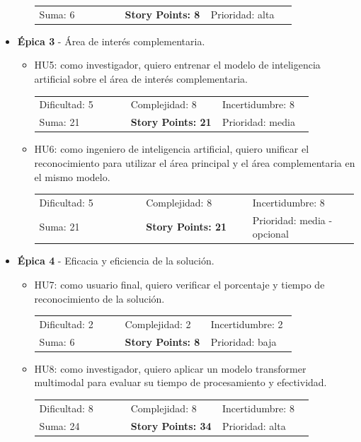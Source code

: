 \documentclass[
11pt, %
]{charter}
\begin{document}
\begin{itemize}
\begin{itemize}
\begin{tabular}{p{0.33\linewidth} p{0.33\linewidth} p{0.33\linewidth}}
      Suma: 6		& \textbf{Story Points: 8} & Prioridad: alta \\
      \end{tabular}
    \end{itemize}
  \item \textbf{\'{E}pica 3} - Área de interés complementaria.
    \begin{itemize}
      \item HU5: como investigador, quiero entrenar el modelo de inteligencia artificial sobre el área de interés complementaria. \\
      \begin{tabular}{p{0.33\linewidth} p{0.33\linewidth} p{0.33\linewidth}}
      Dificultad: 5	& Complejidad: 8 & Incertidumbre: 8 \\
      Suma: 21		& \textbf{Story Points: 21} & Prioridad: media \\
      \end{tabular}
      \item HU6: como ingeniero de inteligencia artificial, quiero unificar el reconocimiento para utilizar el área principal y el área complementaria en el mismo modelo. \\
      \begin{tabular}{p{0.33\linewidth} p{0.33\linewidth} p{0.33\linewidth}}
      Dificultad: 5	& Complejidad: 8 & Incertidumbre: 8 \\
      Suma: 21		& \textbf{Story Points: 21} & Prioridad: media - opcional \\
      \end{tabular}
    \end{itemize}
\newpage
  \item \textbf{\'{E}pica 4} - Eficacia y eficiencia de la solución.
    \begin{itemize}
      \item HU7: como usuario final, quiero verificar el porcentaje y tiempo de reconocimiento de la solución. \\
      \begin{tabular}{p{0.33\linewidth} p{0.33\linewidth} p{0.33\linewidth}}
      Dificultad: 2	& Complejidad: 2 & Incertidumbre: 2 \\
      Suma: 6		& \textbf{Story Points: 8} & Prioridad: baja \\
      \end{tabular}
      \item HU8: como investigador, quiero aplicar un modelo transformer multimodal para evaluar su tiempo de procesamiento y efectividad. \\
      \begin{tabular}{p{0.33\linewidth} p{0.33\linewidth} p{0.33\linewidth}}
      Dificultad: 8	& Complejidad: 8 & Incertidumbre: 8 \\
      Suma: 24		& \textbf{Story Points: 34} & Prioridad: alta \\
      \end{tabular}
    \end{itemize}
\end{itemize}
\end{document}
